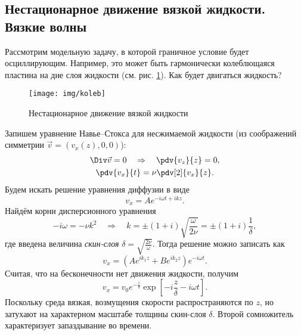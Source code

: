 \subsection[Нестационарное движение вязкой жидкости. Вязкие волны]{Нестационарное движение вязкой жидкости.\\ Вязкие волны}

Рассмотрим модельную задачу, в которой граничное условие будет осциллирующим. Например, это может быть гармонически колеблющаяся пластина на дне слоя жидкости (см. рис. \ref{fig:koleb}). Как будет двигаться жидкость?
\begin{figure}[H]
    \centering
    \texttt{[image: img/koleb]}
    \caption{Нестационарное движение вязкой жидкости}
    \label{fig:koleb}
\end{figure}
Запишем уравнение Навье--Стокса для несжимаемой жидкости (из соображений симметрии $\vec{v}=(v_x (z),0,0)$):
\begin{gather}
    \Div \vec{v} = 0 \quad \Rightarrow \quad \pdv{v_z}{z} = 0,\\
    \pdv{v_x}{t} = \nu \pdv[2]{v_x}{z}.
\end{gather}
Будем искать решение уравнения диффузии в виде
\begin{equation}
    v_x = A e^{-i\omega t + ikz}.
\end{equation}
Найдём корни дисперсионного уравнения
\begin{equation}
    -i \omega = -\nu k^2 \quad \Rightarrow \quad
    k = \pm(1+i) \sqrt{\frac{\omega}{2\nu}} = \pm (1+i) \frac{1}{\delta},
\end{equation}
где введена величина \textit{скин-слоя} $\delta=\sqrt{\frac{2\nu}{\omega}}$.
Тогда решение можно записать как
\begin{equation}
    v_x=(Ae^{ik_1 z}+Be^{ik_2 z})e^{-i\omega t}.
\end{equation}
Считая, что на бесконечности нет движения жидкости, получим
\begin{equation}
    v_x=v_0 e^{-\frac{z}{\delta}} \exp[-i \frac{z}{\delta}- i\omega t].
\end{equation}
Поскольку среда вязкая, возмущения скорости распространяются по $z$, но затухают на характерном масштабе толщины скин-слоя $\delta$. Второй сомножитель характеризует запаздывание во времени.

